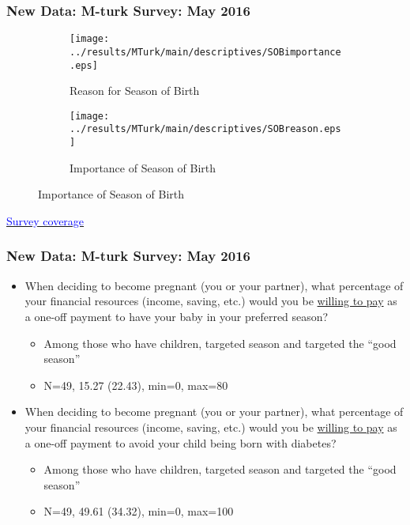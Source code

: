 \documentclass[10pt,letterpaper,subeqn]{beamer}
\begin{document}
\begin{frame}[label=MTurk]
  \frametitle{New Data: M-turk Survey: May 2016}
  \begin{figure}[htpb!]
    \begin{center}
      \begin{subfigure}{.5\textwidth}
        \centering
      \texttt{[image: ../results/MTurk/main/descriptives/SOBimportance.eps]}
      \caption{Reason for Season of Birth}
      \label{fig:importanceMTurk}
      \end{subfigure}%
      \begin{subfigure}{.5\textwidth}
        \centering
        \texttt{[image: ../results/MTurk/main/descriptives/SOBreason.eps]}
        \caption{Importance of Season of Birth}
        \label{fig:reasonMTurk}
      \end{subfigure}
    \end{center}
  \end{figure}
\hyperlink{MTurkCover}{\footnotesize \textcolor{blue}{Survey coverage}}
\end{frame}

\begin{frame}
  \frametitle{New Data: M-turk Survey: May 2016}
  \begin{itemize}
  \item When deciding to become pregnant (you or your partner), what percentage of your financial resources (income, saving, etc.) would you be \underline{willing to pay} as a one-off payment to \textcolor[rgb]{0.00,0.18,0.51}{have your baby in your preferred season}?
    \begin{itemize}
    \item Among those who have children, targeted season and targeted the ``good season''
    \item N=49, \textcolor[rgb]{0.00,0.18,0.51}{15.27} (22.43), min=0, max=80
    \end{itemize}
  \end{itemize}
  \begin{itemize}
  \item When deciding to become pregnant (you or your partner), what percentage of your financial resources (income, saving, etc.) would you be \underline{willing to pay} as a one-off payment to \textcolor[rgb]{1.00,0.00,0.00}{avoid your child being born with diabetes}?
    \begin{itemize}
    \item Among those who have children, targeted season and targeted the ``good season''
    \item N=49, \textcolor[rgb]{1.00,0.00,0.00}{49.61} (34.32), min=0, max=100
    \end{itemize}
  \end{itemize}
\end{frame}
\end{document}
